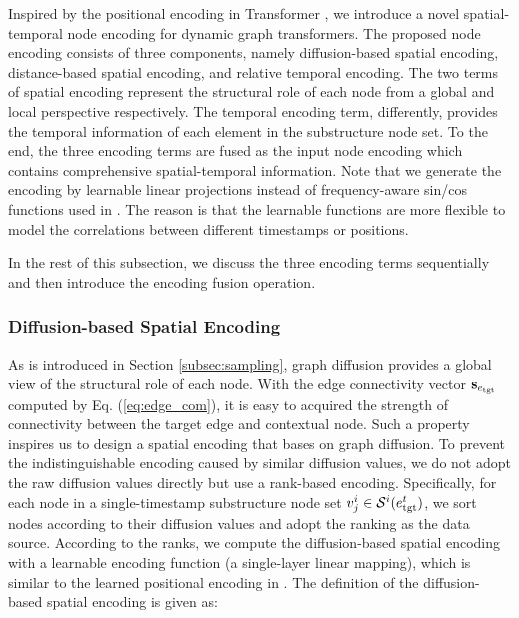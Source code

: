 \documentclass[10pt,journal,compsoc]{IEEEtran}
\newcommand{\HL}{}
\begin{document}
Inspired by the positional encoding in Transformer \cite{vaswani2017attention}, we introduce a novel spatial-temporal node encoding for dynamic graph transformers. The proposed node encoding consists of three components, namely diffusion-based spatial encoding, distance-based spatial encoding, and relative temporal encoding. The two terms of spatial encoding represent the structural role of each node from a global and local perspective respectively. The temporal encoding term, differently, provides the temporal information of each element in the substructure node set. To the end, the three encoding terms are fused \HL{as} the input node encoding which contains comprehensive spatial-temporal information. \HL{Note that we generate the encoding by learnable linear projections instead of frequency-aware sin/cos functions used in \cite{vaswani2017attention}. The reason is that the learnable functions are more flexible to model the correlations between different timestamps or positions.}

In the rest of this subsection, we discuss the three encoding terms sequentially and then introduce the encoding fusion operation.

\subsubsection{Diffusion-based Spatial Encoding} \label{subsec:diffusion_encoding}

As is introduced in Section \ref{subsec:sampling}, graph diffusion provides a global view \HL{of} the structural role of each node. With the edge connectivity vector $\mathbf{s}_{e_{\rm tgt}}$ computed by Eq. (\ref{eq:edge_com}), it is easy to acquired the strength of connectivity between the target edge and contextual node. Such \HL{a} property inspires us to design a spatial encoding that bases on graph diffusion. To prevent the indistinguishable encoding caused by similar diffusion values, we do not adopt the raw diffusion values directly but use a rank-based encoding. Specifically, for each node in a single-timestamp substructure node set $v_j^i \in \mathcal{S}^i(e^t_{\rm tgt})$, we sort nodes according to their diffusion values and adopt the ranking as the data source. According to the ranks, we compute the diffusion-based spatial encoding with a learnable encoding function (a single-layer linear mapping), which is similar to the learned positional encoding in \cite{gehring2017convolutional,vaswani2017attention}. The definition of the diffusion-based spatial encoding is given as:
\end{document}
